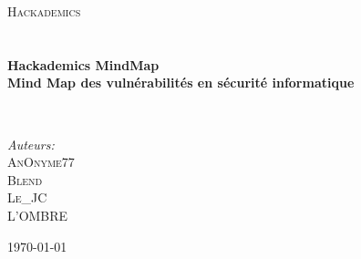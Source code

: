 



\begin{titlepage}
\begin{center}


\textsc{\LARGE Hackademics}\\[1.5cm]

\textsc{\Large }\\[0.5cm]

\HRule \\[0.4cm]

{\huge \bfseries Hackademics MindMap\\
Mind Map des vulnérabilités en sécurité informatique \\[0.4cm] }

\HRule \\[1.5cm]

\begin{minipage}{0.4\textwidth}
\begin{flushleft} \large
\emph{Auteurs:}\\
\textsc{AnOnyme77}\\
\textsc{Blend}\\
\textsc{Le\_JC}\\
\textsc{L'OMBRE}
\end{flushleft}
\end{minipage}

\vfill

{\large \today}

\end{center}
\end{titlepage}

\endinput
